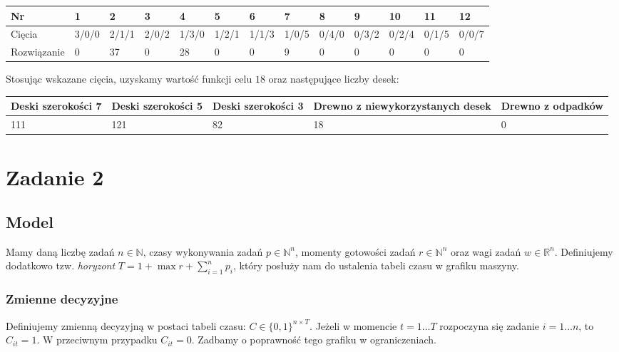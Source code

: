 \documentclass{article}
\theoremstyle{definition}
\theoremstyle{remark}
\theoremstyle{plain}
\theoremstyle{remark}
\theoremstyle{plain}
\begin{document}
\begin{table}[H]
\centering
\begin{tabular}{|l|l|l|l|l|l|l|l|l|l|l|l|l|}
\hline
Nr          & 1     & 2     & 3     & 4     & 5     & 6     & 7     & 8     & 9     & 10    & 11    & 12    \\ \hline
Cięcia      & 3/0/0 & 2/1/1 & 2/0/2 & 1/3/0 & 1/2/1 & 1/1/3 & 1/0/5 & 0/4/0 & 0/3/2 & 0/2/4 & 0/1/5 & 0/0/7 \\ \hline
Rozwiązanie & 0     & 37    & 0     & 28    & 0     & 0     & 9     & 0     & 0     & 0     & 0     & 0     \\ \hline
\end{tabular}
\end{table}

Stosując wskazane cięcia, uzyskamy wartość funkcji celu $18$ oraz następujące liczby desek:

\begin{table}[H]
\centering
\begin{tabular}{|l|l|l|l|l|}
\hline
Deski szerokości 7 & Deski szerokości 5 & Deski szerokości 3 & Drewno z niewykorzystanych desek & Drewno z odpadków \\ \hline
111                & 121                & 82                 & 18                               & 0                 \\ \hline
\end{tabular}
\end{table}

\section{Zadanie 2}
\subsection{Model}
Mamy daną liczbę zadań $n\in\mathbb{N}$, czasy wykonywania zadań $p\in \mathbb{N}^n$, momenty gotowości zadań $r\in\mathbb{N}^n$ oraz wagi zadań $w\in \mathbb{R}^n$. Definiujemy dodatkowo tzw. \textit{horyzont} $T=1+\max{r}+\sum_{i=1}^n{p_i}$, który posłuży nam do ustalenia tabeli czasu w grafiku maszyny.

\subsubsection{Zmienne decyzyjne}
Definiujemy zmienną decyzyjną w postaci tabeli czasu: $C\in \{0,1\}^{n\times T}$. Jeżeli w momencie $t=1\ldots T$ rozpoczyna się zadanie $i=1\ldots n$, to $C_{it}=1$. W przeciwnym przypadku $C_{it}=0$. Zadbamy o poprawność tego grafiku w ograniczeniach.
\end{document}
